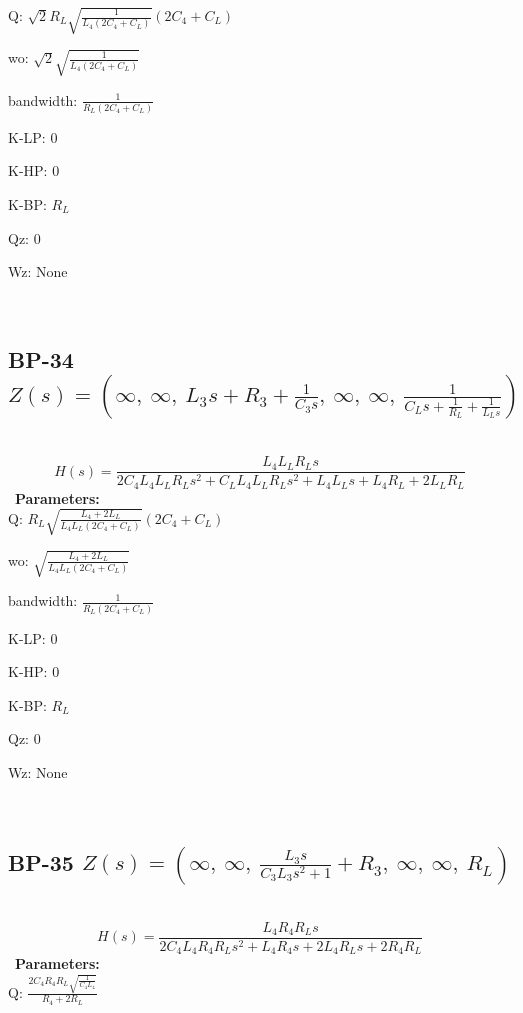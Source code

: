 \documentclass{article}
\begin{document}
Q: $\sqrt{2} R_{L} \sqrt{\frac{1}{L_{4} \left(2 C_{4} + C_{L}\right)}} \left(2 C_{4} + C_{L}\right)$\ 

wo: $\sqrt{2} \sqrt{\frac{1}{L_{4} \left(2 C_{4} + C_{L}\right)}}$\ 

bandwidth: $\frac{1}{R_{L} \left(2 C_{4} + C_{L}\right)}$\ 

K-LP: $0$\ 

K-HP: $0$\ 

K-BP: $R_{L}$\ 

Qz: $0$\ 

Wz: $\text{None}$\ 

\ 

\subsection{BP-34 $Z(s) = \left( \infty, \  \infty, \  L_{3} s + R_{3} + \frac{1}{C_{3} s}, \  \infty, \  \infty, \  \frac{1}{C_{L} s + \frac{1}{R_{L}} + \frac{1}{L_{L} s}}\right)$ } \ 
\textbf{\[H(s) = \frac{L_{4} L_{L} R_{L} s}{2 C_{4} L_{4} L_{L} R_{L} s^{2} + C_{L} L_{4} L_{L} R_{L} s^{2} + L_{4} L_{L} s + L_{4} R_{L} + 2 L_{L} R_{L}}\] } \ 
\textbf{Parameters:}\\ 

Q: $R_{L} \sqrt{\frac{L_{4} + 2 L_{L}}{L_{4} L_{L} \left(2 C_{4} + C_{L}\right)}} \left(2 C_{4} + C_{L}\right)$\ 

wo: $\sqrt{\frac{L_{4} + 2 L_{L}}{L_{4} L_{L} \left(2 C_{4} + C_{L}\right)}}$\ 

bandwidth: $\frac{1}{R_{L} \left(2 C_{4} + C_{L}\right)}$\ 

K-LP: $0$\ 

K-HP: $0$\ 

K-BP: $R_{L}$\ 

Qz: $0$\ 

Wz: $\text{None}$\ 

\ 

\subsection{BP-35 $Z(s) = \left( \infty, \  \infty, \  \frac{L_{3} s}{C_{3} L_{3} s^{2} + 1} + R_{3}, \  \infty, \  \infty, \  R_{L}\right)$ } \ 
\textbf{\[H(s) = \frac{L_{4} R_{4} R_{L} s}{2 C_{4} L_{4} R_{4} R_{L} s^{2} + L_{4} R_{4} s + 2 L_{4} R_{L} s + 2 R_{4} R_{L}}\] } \ 
\textbf{Parameters:}\\ 

Q: $\frac{2 C_{4} R_{4} R_{L} \sqrt{\frac{1}{C_{4} L_{4}}}}{R_{4} + 2 R_{L}}$\ 
\end{document}

